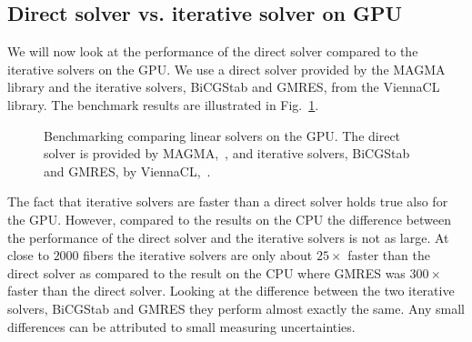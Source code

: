 \subsection{Direct solver vs. iterative solver on GPU}

We will now look at the performance of the direct solver compared to the iterative solvers on the GPU. We use a direct solver provided by the MAGMA library and the iterative solvers, BiCGStab and GMRES, from the ViennaCL library. The benchmark results are illustrated in Fig.~\ref{fig:bench_cuda_solvers}.

\begin{figure}[!htbp]
  \centering
  \caption[Benchmark linear solvers on GPU.]{Benchmarking comparing linear solvers on the GPU. The direct solver is provided by MAGMA,~\cite{MagmaDocumentation}, and iterative solvers, BiCGStab and GMRES, by ViennaCL,~\cite{ViennaCLRupp2010}.}
  \label{fig:bench_cuda_solvers}
\end{figure}

The fact that iterative solvers are faster than a direct solver holds true also for the GPU. However, compared to the results on the CPU the difference between the performance of the direct solver and the iterative solvers is not as large. At close to $2000$ fibers the iterative solvers are only about $25×$ faster than the direct solver as compared to the result on the CPU where GMRES was $300×$ faster than the direct solver. Looking at the difference between the two iterative solvers, BiCGStab and GMRES they perform almost exactly the same. Any small differences can be attributed to small measuring uncertainties. 

